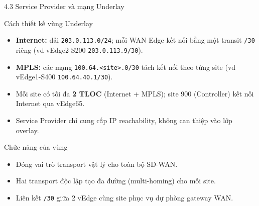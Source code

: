 \begin{frame}{4.3 Service Provider và mạng Underlay}
    \small
    \begin{block}{Cách thiết kế vùng Underlay}
        \begin{itemize}
            \item \textbf{Internet:} dải \texttt{203.0.113.0/24}; mỗi
                  WAN Edge kết nối bằng một transit \texttt{/30} riêng
                  (vd vEdge2-S200 \texttt{203.0.113.9/30}).
            \item \textbf{MPLS:} các mạng \texttt{100.64.<site>.0/30}
                  tách kết nối theo từng site (vd vEdge1-S400
                  \texttt{100.64.40.1/30}).
            \item Mỗi site có tối đa \textbf{2 TLOC} (Internet + MPLS);
                  site 900 (Controller) kết nối Internet qua vEdge65.
            \item Service Provider chỉ cung cấp IP reachability, không
                  can thiệp vào lớp overlay.
        \end{itemize}
    \end{block}
    \vspace{0.12cm}
    \begin{block}{Chức năng của vùng}
        \begin{itemize}
            \item Đóng vai trò transport vật lý cho toàn bộ SD-WAN.
            \item Hai transport độc lập tạo đa đường (multi-homing) cho
                  mỗi site.
            \item Liên kết \texttt{/30} giữa 2 vEdge cùng site phục vụ
                  dự phòng gateway WAN.
        \end{itemize}
    \end{block}
\end{frame}

